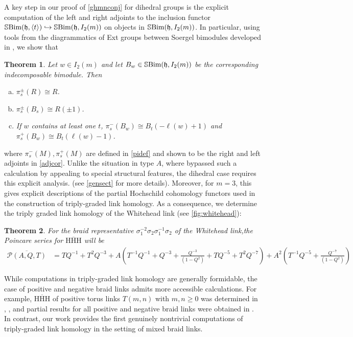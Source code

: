 \documentclass[10pt]{article}
\newtheorem{theorem}{Theorem}
\numberwithin{theorem}{section}
\theoremstyle{definition}
\newcommand{\hf}{\mathfrak{h}}
\newcommand{\sbim}{\mathbb{S}\textnormal{Bim}}
\newcommand{\abrac}[1]{\left\langle#1\right\rangle}
\newcommand{\paren}[1]{\left( #1 \right)}
\newcommand{\hhh}{\mathrm{HHH}}
\newcommand{\0}{\ \raisebox{-2ex}{\begin{tikzpicture}[xscale=0.25,yscale=0.3,thick,baseline]
 \draw (0,0) -- (0,3); 
\end{tikzpicture}}}
\renewcommand{\1}{\ \raisebox{-2ex}{\begin{tikzpicture}[xscale=0.25,yscale=0.3,thick,baseline]
 \draw (0,0) -- (0,1);
 \draw (0,2) -- (0,3);
 \node[dot] at (0,1) {};
  \node[dot] at (0,2) {};
\end{tikzpicture}}}
\begin{document}
A key step in our proof of \cref{ghmnconj} for dihedral groups is the explicit computation of the left and right adjoints to the inclusion functor $\sbim(\hf, \abrac{t} )\hookrightarrow \sbim(\hf, I_2(m)) $ on objects in $\sbim(\hf, I_2(m))$. In particular, using tools from the diagrammatics of Ext groups between Soergel bimodules developed in \cite{Li25}, we show that 


\begin{theorem}
   Let $w\in I_2(m)$ and let $B_w\in \sbim(\hf, I_2(m))$ be the corresponding indecomposable bimodule. Then 
   \begin{enumerate}[(a)]
        \item $\pi^{\pm}_s(R)\cong R$.
       \item $\pi^{\pm}_s(B_s)\cong R(\pm 1)$.
       \item If $w$ contains at least one $t$, $\pi_s^-(B_w)\cong B_t (-\ell(w)+1) $ and $\pi_s^+(B_w)\cong B_t (\ell(w)-1) $.
   \end{enumerate}
\end{theorem}
where $\pi^-_s(M), \pi^+_s(M)$ are defined in \cref{pidef} and shown to be the right and left adjoints in \cref{adjcor}. Unlike the situation in type $A$, where \cite{GHMN19} bypassed such a calculation by appealing to special structural features, the dihedral case requires this explicit analysis. (see \cref{gensect} for more details). Moreover, for $m=3$, this gives explicit descriptions of the partial Hochschild cohomology functors used in the construction of triply-graded link homology. As a consequence, we determine the triply graded link homology of the Whitehead link (see \cref{fig:whitehead}):

\begin{theorem}
For the braid representative $\sigma_1^{-2}\sigma_2\sigma_1^{-1}\sigma_2$ of the Whitehead link,the Poincare series for $\overline{\hhh}$ will be
\begin{align*}
    \overline{\mathscr{P}(A, Q, T)}&=TQ^{-1}+T^2Q^{-3}+A\paren{T^{-1}Q^{-1} + Q^{-3}+\frac{Q^{-3}}{(1-Q^2)} +TQ^{-5}+T^2Q^{-7} } +A^2 \paren{ T^{-1}Q^{-5}+\frac{Q^{-7}}{(1-Q^2)}} 
\end{align*}
\end{theorem}
While computations in triply-graded link homology are generally formidable, the case of positive and negative braid links admits more accessible calculations. For example, $\overline{\hhh}$ of positive torus links $T(m,n)$ with $m,n \geq 0$ was determined in \cite{EH19}, \cite{HM19}, and partial results for all positive and negative braid links were obtained in \cite{last3li}. In contrast, our work provides the first genuinely nontrivial computations of triply-graded link homology in the setting of mixed braid links.
\end{document}

